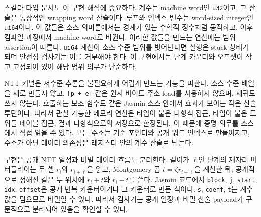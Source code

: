 \documentclass[10pt,twocolumn]{article}
\newcommand{\jasmin}{Jasmin}
\begin{document}
스칼라 타입 문서도 이 구현 해석에 중요하다. 계수는 machine word인
\texttt{u32}이고, 그 산술은 통상적인 wrapping word 산술이다. 루프와
인덱스 변수는 word-sized integer인 \texttt{ui64}이다. 이 값들은 소스
의미론에서는 경계가 있는 수학적 정수처럼 동작하고, 이후 컴파일 과정에서
machine word로 바뀐다. 이러한 값들을 만드는 연산에는 범위 assertion이
따른다. \texttt{ui64} 계산이 소스 수준 범위를 벗어난다면 실행은 stuck
상태가 되며 안전성 검사기는 이를 거부해야 한다. 이 구현에서는 단계
카운터와 오프셋이 작고 고정되어 있어 해당 범위 의무가 단순하다.

NTT 커널은 저수준 추론을 불필요하게 어렵게 만드는 기능을 피한다.
소스 수준 배열을 새로 만들지 않고, \texttt{[p + e]} 같은 원시 바이트
주소 load를 사용하지 않으며, 재귀도 쓰지 않는다. 호출하는 보조 함수도
같은 \jasmin{} 소스 안에서 효과가 보이는 작은 산술 루틴이다. 따라서
관찰 가능한 메모리 연산은 타입이 붙은 다항식 접근, 타입이 붙은 트위들
테이블 접근, 결과 다항식으로의 저장으로 한정된다. 이 때문에 증명
의무를 소스에서 직접 읽을 수 있다. 모든 주소는 기준 포인터와 공개
워드 인덱스로 만들어지고, 주소가 아닌 데이터 의존성은 레지스터 안의
계수 산술로 남는다.

구현은 공개 NTT 일정과 비밀 데이터 흐름도 분리한다. 길이가 \(\ell\)인
단계의 제자리 버터플라이는 두 셀 \(r_i\)와 \(r_{i+\ell}\)을 읽고,
Montgomery 곱 \(t=\zeta r_{i+\ell}\)을 계산한 뒤, 공개적으로 정해진
같은 두 위치에 \(r_i+t\)와 \(r_i-t\)를 쓴다. \jasmin{} 코드에서
\texttt{block}, \texttt{j}, \texttt{start}, \texttt{idx},
\texttt{offset}은 공개 반복 카운터이거나 그 카운터로 만든 식이다.
\texttt{s}, \texttt{coeff}, \texttt{t}는 계수 값을 담으므로 비밀일 수
있다. 따라서 검사기는 공개 일정과 비밀 산술 payload가 구문적으로
분리되어 있음을 확인할 수 있다.
\end{document}
